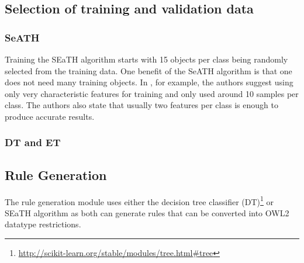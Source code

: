 \documentclass[authoryear, review,12pt,number]{elsarticle}
\begin{document}
\label{Selection_of_training_validation_data}
\subsection{Selection of training and validation data}
\subsubsection{SeATH}
Training the SEaTH algorithm %
starts with 15 
objects per class being randomly selected from the training data. One benefit of the SeATH algorithm is that one does not need many training
objects.
In \cite{Nussbaum2006}, for example, the authors suggest using only very
characteristic features for training and only used around 10 samples per
class. The authors also state that usually two features
per class is enough to produce accurate results.\\
\subsubsection{DT and ET}

\label{subsec_rulegen_data_mining}
\subsection{Rule Generation}
The %
rule generation module uses either the decision tree classifier 
(DT)\footnote{\url{http://scikit-learn.org/stable/modules/tree.html\#tree}} 
\citep{scikit-learn} or SEaTH algorithm \citep{Nussbaum2006} as both can 
generate rules that can be converted into OWL2 datatype restrictions. 
\end{document}

